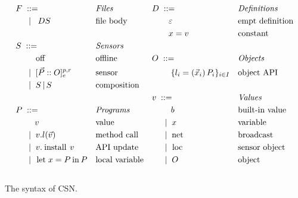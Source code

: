 \begin{myfigure}
\begin{align*}
  & F \grmeq & & \text{\emph{Files}}                    & & D \grmeq & & \text{\emph{Definitions}}\\
  & \quad \grmor \; D S & & \text{file body}            & & \qquad \varepsilon & & \text{empt definition}\\
  & & &                                                 & & \qquad x = v & & \text{constant}\\
  & S \grmeq & & \text{\emph{Sensors}}                  & &  \\
  & \qquad \; \inactionn & & \text{offline}             & &  O \grmeq & & \text{\emph{Objects}} \\       
  & \quad \grmor \sensord & & \text{sensor}             & &  \qquad \; \moduled & & \text{object API}\\
  & \quad \grmor S \parn S & & \text{composition}       & &  & & \\  
  & & &                                                 & &  v \grmeq & & \text{\emph{Values}}\\ 
  & P \grmeq & & \text{\emph{Programs}}                 & &  \qquad \; b & & \text{built-in value}\\
  & \qquad \; v & & \text{value}                        & &  \quad \grmor x & & \text{variable}\\ 
  & \quad \grmor \invkd & & \text{method call}          & &  \quad \grmor \netk & & \text{broadcast}\\
  & \quad \grmor \installd & & \text{API update}        & &  \quad \grmor \lock & & \text{sensor object}\\
  & \quad \grmor \Letd & & \text{local variable}        & &  \quad \grmor O & & \text{object} 
\end{align*}
\\[-0.4cm]
\caption{The syntax of CSN.}
\label{fig:syntax-sensor}
\end{myfigure}

